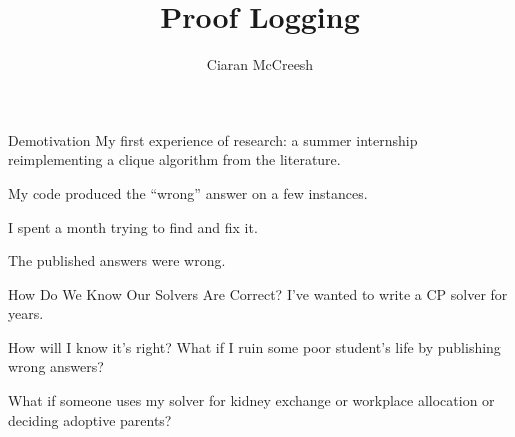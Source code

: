\documentclass[aspectratio=169,compress,10pt]{beamer}
\author{Ciaran McCreesh}
\title{Proof Logging}
\begin{document}
{
    \begin{frame}
        \titlepage
    \end{frame}
}

\begin{frame}{Demotivation}
    My first experience of research: a summer internship reimplementing a clique algorithm from the literature.

    \bigskip

    My code produced the ``wrong'' answer on a few instances.

    \bigskip\pause

    I spent a month trying to find and fix it.

    \bigskip\pause

    The published answers were wrong.
\end{frame}

\begin{frame}{How Do We Know Our Solvers Are Correct?}
    I've wanted to write a CP solver for years.

    \bigskip

    How will I know it's right? What if I ruin some poor student's life by publishing wrong answers?

    \bigskip\pause

    What if someone uses my solver for kidney exchange or workplace allocation or deciding adoptive parents?
\end{frame}
\end{document}
